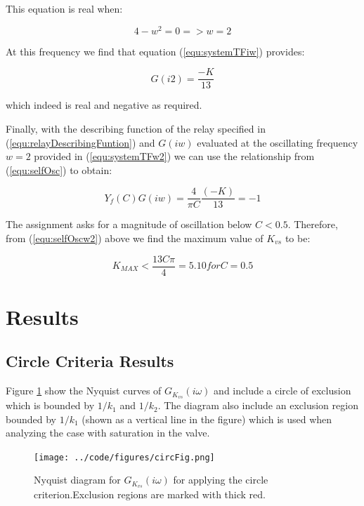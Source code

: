 \documentclass[a4paper, titlepage]{article}
\begin{document}
This equation is real when:

\begin{equation}
4-w^2 = 0 => w=2
\label{equ:systemTFreal}
\end{equation}

At this frequency we find that equation (\ref{equ:systemTFiw}) provides:

\begin{equation}
G(i2) = \frac{-K}{13}
\label{equ:systemTFw2}
\end{equation}

which indeed is real and negative as required.

Finally, with the describing function of the relay specified in  (\ref{equ:relayDescribingFuntion}) and $G(iw)$ evaluated at the oscillating frequency $w=2$ provided in (\ref{equ:systemTFw2}) we can use the relationship from (\ref{equ:selfOsc}) to obtain:

\begin{equation}
Y_{f}(C)G(iw) = \frac{4}{\pi C}\frac{(-K)}{13} = -1
\label{equ:selfOscw2}
\end{equation}

The assignment asks for a magnitude of oscillation below $C < 0.5$.
Therefore, from (\ref{equ:selfOscw2}) above we find the maximum value of $K_{vs}$ to be:

\begin{equation}
K_{MAX} < \frac{13C\pi}{4} = 5.10 for C=0.5
\label{equ:maximum_k}
\end{equation}

\section{Results}

\subsection{Circle Criteria Results}
Figure \ref{fig:circCrit} show the Nyquist curves of $G_{K_{vs}}(i\omega)$ and include a circle of exclusion which is bounded by $1/k_{1}$ and $1/k_{2}$.  The diagram also include an exclusion region bounded by $1/k_{1}$ (shown as a vertical line in the figure) which is used when analyzing the case with saturation in the valve.

\begin{figure}[H]
\center
\texttt{[image: ../code/figures/circFig.png]}
\caption{Nyquist diagram for $G_{K_{vs}}(i\omega)$ for applying the circle criterion.Exclusion regions are marked with thick red.}
\label{fig:circCrit}
\end{figure}
\end{document}
